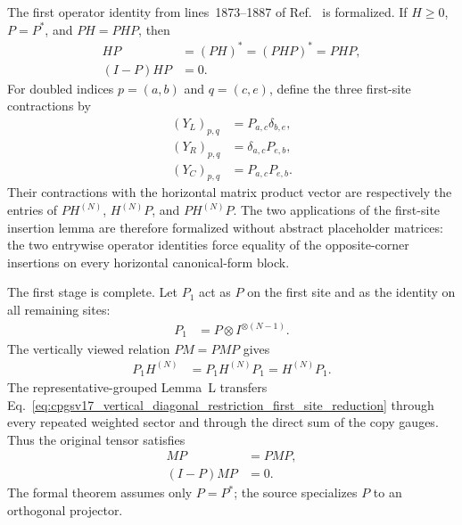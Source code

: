 \documentclass{article}
\begin{document}
The first operator identity from lines~1873--1887 of
Ref.~\cite{Cirac2016MPDO_arXiv} is formalized. If $H\geq0$, $P=P^*$, and
$PH=PHP$, then
\begin{align}
    HP
     & =(PH)^*
    =(PHP)^*
    =PHP,
    \label{eq:cpgsv17_vertical_diagonal_restriction_positive_corner_adjoint} \\
    (I-P)HP
     & =0.
    \label{eq:cpgsv17_vertical_diagonal_restriction_positive_corner_vanishes}
\end{align}
For doubled indices $p=(a,b)$ and $q=(c,e)$, define the three first-site
contractions by
\begin{align}
    (Y_L)_{p,q}
     & =P_{a,c}\delta_{b,e},
    \label{eq:cpgsv17_vertical_diagonal_restriction_left_insertion}  \\
    (Y_R)_{p,q}
     & =\delta_{a,c}P_{e,b},
    \label{eq:cpgsv17_vertical_diagonal_restriction_right_insertion} \\
    (Y_C)_{p,q}
     & =P_{a,c}P_{e,b}.
    \label{eq:cpgsv17_vertical_diagonal_restriction_corner_insertion}
\end{align}
Their contractions with the horizontal matrix product vector are respectively
the entries of $PH^{(N)}$, $H^{(N)}P$, and $PH^{(N)}P$. The two applications
of the first-site insertion lemma are therefore formalized without abstract
placeholder matrices: the two entrywise operator identities force equality of
the opposite-corner insertions on every horizontal canonical-form block.

The first stage is complete. Let $P_1$ act as $P$ on the first site and as the
identity on all remaining sites:
\begin{align}
    P_1
     & =P\otimes I^{\otimes(N-1)}.
    \label{eq:cpgsv17_vertical_diagonal_restriction_first_site_projection}
\end{align}
The vertically viewed relation $PM=PMP$ gives
\begin{align}
    P_1H^{(N)}
     & =P_1H^{(N)}P_1
    =H^{(N)}P_1.
    \label{eq:cpgsv17_vertical_diagonal_restriction_first_site_reduction}
\end{align}
The representative-grouped Lemma~L transfers
Eq.~\ref{eq:cpgsv17_vertical_diagonal_restriction_first_site_reduction}
through every repeated weighted sector and through the direct sum of the copy
gauges. Thus the original tensor satisfies
\begin{align}
    MP
     & =PMP,
    \label{eq:cpgsv17_vertical_diagonal_restriction_opposite_corner_identity} \\
    (I-P)MP
     & =0.
    \label{eq:cpgsv17_vertical_diagonal_restriction_opposite_corner_vanishes}
\end{align}
The formal theorem assumes only $P=P^*$; the source specializes $P$ to an
orthogonal projector.
\end{document}
